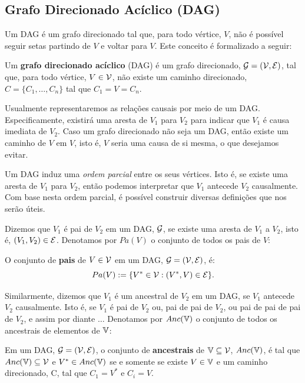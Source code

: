 \subsection{Grafo Direcionado Acíclico (DAG)}

Um DAG é um grafo direcionado tal que,
para todo vértice, $V$, não é possível
seguir setas partindo de $V$ e
voltar para $V$. Este conceito é
formalizado a seguir:

\begin{definition}
 \label{def:dag}
 Um \textbf{grafo direcionado acíclico} (DAG) é
 um grafo direcionado, ${\mathcal G} = ({\mathcal V}, {\mathcal E})$,
 tal que, para todo
 vértice, $V \in {\mathcal V}$, não existe um
 caminho direcionado, $C = \{C_1, \ldots, C_n\}$
 tal que $C_1 = V = C_n$.
\end{definition}

Usualmente representaremos
as relações causais por meio de um DAG.
Especificamente, existirá uma aresta de $V_1$ para $V_2$
para indicar que $V_1$ é causa imediata de $V_2$.
Caso um grafo direcionado não seja um DAG,
então existe um caminho de $V$ em $V$, isto é,
$V$ seria uma causa de si mesma, 
o que desejamos evitar.

Um DAG induz uma \textit{ordem parcial} entre 
os seus vértices. Isto é,
se existe uma aresta de $V_1$ para $V_2$,
então podemos interpretar que
$V_1$ antecede $V_2$ causalmente.
Com base nesta ordem parcial, é
possível construir diversas
definições que nos serão úteis.

Dizemos que $V_1$ é pai de $V_2$ em
um DAG, ${\mathcal G}$, se
existe uma aresta de $V_1$ a $V_2$,
isto é, $(V_1, V_2) \in {\mathcal E}$.
Denotamos por $Pa(V)$ o
conjunto de todos os pais de $V$:

\begin{definition}
 \label{def:pais}
 O conjunto de \textbf{pais} de $V \in {\mathcal V}$ 
 em um DAG, ${\mathcal G} = ({\mathcal V}, {\mathcal E})$, é:
 $$Pa(V) := \{V^* \in {\mathcal V}: (V^*, V) \in {\mathcal E}\}.$$
\end{definition}

Similarmente, dizemos que $V_1$ é um ancestral de $V_2$ em
um DAG, se $V_1$ antecede $V_2$ causalmente. Isto é,
se $V_1$ é pai de $V_2$ ou, pai de pai de $V_2$, ou
pai de pai de pai de $V_2$, e assim por diante $\ldots$
Denotamos por $Anc({\mathbb V})$ o conjunto de 
todos os ancestrais de elementos de ${\mathbb V}$:

\begin{definition}
 \label{def:ancestrais}
 Em um DAG, ${\mathcal G} = ({\mathcal V}, {\mathcal E})$,
 o conjunto de \textbf{ancestrais} de ${\mathbb V} \subseteq {\mathcal V}$, 
 $Anc({\mathbb V})$, é tal que
 $Anc({\mathbb V}) \subseteq {\mathcal V}$ e
 $V^* \in Anc({\mathbb V})$ se e somente se existe
 $V \in {\mathbb V}$ e
 um caminho direcionado, C, tal que
 $C_1 = V^*$ e $C_i = V$.
\end{definition}

